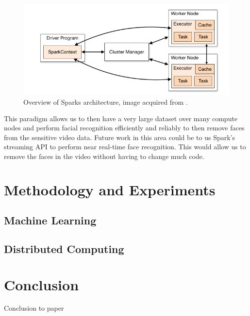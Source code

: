 \documentclass[
	submission,
	final,
	notitlepage,
	narroweqnarray,
	inline,
	twoside,
	]{ieee}
\begin{document}
\begin{figure}[h]
\centering
\includegraphics[width=\linewidth]{figures/spark_model}
\caption{Overview of Sparks architecture, image acquired from \cite{spark}.}
\label{fig:spark_model} 
\end{figure}
\FloatBarrier

This paradigm allows us to then have a very large dataset over many compute
nodes and perform facial recognition efficiently and reliably to then 
remove faces from the sensitive video data. Future work in this area
could be to us Spark's streaming API to perform near real-time face recognition. 
This would allow us to remove the faces in the video without having to 
change much code. 

\section{Methodology and Experiments} 
\subsection{Machine Learning} 
\subsection{Distributed Computing}

\section{Conclusion}
\PARstart Conclusion to paper



\end{document}
